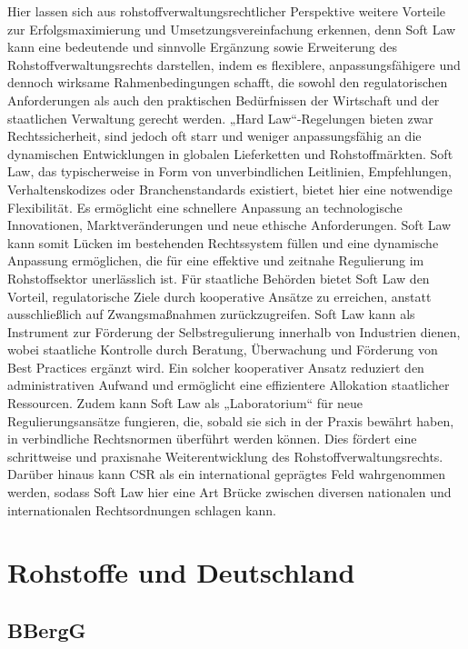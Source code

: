 \documentclass[12pt,a4paper,oneside]{book} %
\begin{document}
{	Hier lassen sich aus rohstoffverwaltungsrechtlicher Perspektive weitere Vorteile zur Erfolgsmaximierung und Umsetzungsvereinfachung erkennen, denn Soft Law kann eine bedeutende und sinnvolle Ergänzung sowie Erweiterung des Rohstoffverwaltungsrechts darstellen, indem es flexiblere, anpassungsfähigere und dennoch wirksame Rahmenbedingungen schafft, die sowohl den regulatorischen Anforderungen als auch den praktischen Bedürfnissen der Wirtschaft und der staatlichen Verwaltung gerecht werden. „Hard Law“-Regelungen bieten zwar Rechtssicherheit, sind jedoch oft starr und weniger anpassungsfähig an die dynamischen Entwicklungen in globalen Lieferketten und Rohstoffmärkten. Soft Law, das typischerweise in Form von unverbindlichen Leitlinien, Empfehlungen, Verhaltenskodizes oder Branchenstandards existiert, bietet hier eine notwendige Flexibilität. Es ermöglicht eine schnellere Anpassung an technologische Innovationen, Marktveränderungen und neue ethische Anforderungen. Soft Law kann somit Lücken im bestehenden Rechtssystem füllen und eine dynamische Anpassung ermöglichen, die für eine effektive und zeitnahe Regulierung im Rohstoffsektor unerlässlich ist. Für staatliche Behörden bietet Soft Law den Vorteil, regulatorische Ziele durch kooperative Ansätze zu erreichen, anstatt ausschließlich auf Zwangsmaßnahmen zurückzugreifen. Soft Law kann als Instrument zur Förderung der Selbstregulierung innerhalb von Industrien dienen, wobei staatliche Kontrolle durch Beratung, Überwachung und Förderung von Best Practices ergänzt wird. Ein solcher kooperativer Ansatz reduziert den administrativen Aufwand und ermöglicht eine effizientere Allokation staatlicher Ressourcen. Zudem kann Soft Law als „Laboratorium“ für neue Regulierungsansätze fungieren, die, sobald sie sich in der Praxis bewährt haben, in verbindliche Rechtsnormen überführt werden können. Dies fördert eine schrittweise und praxisnahe Weiterentwicklung des Rohstoffverwaltungsrechts. Darüber hinaus kann CSR als ein international geprägtes Feld wahrgenommen werden, sodass Soft Law hier eine Art Brücke zwischen diversen nationalen und internationalen Rechtsordnungen schlagen kann.
	
	
	\section{Rohstoffe und Deutschland}
	
	\subsection{BBergG}
	
}
\end{document}
